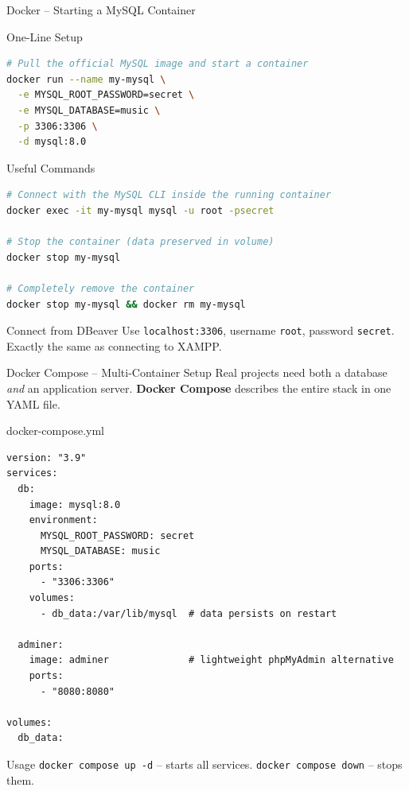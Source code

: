 \begin{frame}[fragile]{Docker -- Starting a MySQL Container}
  \begin{block}{One-Line Setup}
\begin{lstlisting}[style=sqlstyle, language=bash]
# Pull the official MySQL image and start a container
docker run --name my-mysql \
  -e MYSQL_ROOT_PASSWORD=secret \
  -e MYSQL_DATABASE=music \
  -p 3306:3306 \
  -d mysql:8.0
\end{lstlisting}
  \end{block}

  \begin{block}{Useful Commands}
\begin{lstlisting}[style=sqlstyle, language=bash]
# Connect with the MySQL CLI inside the running container
docker exec -it my-mysql mysql -u root -psecret

# Stop the container (data preserved in volume)
docker stop my-mysql

# Completely remove the container
docker stop my-mysql && docker rm my-mysql
\end{lstlisting}
  \end{block}

  \begin{examples}{Connect from DBeaver}
    Use \texttt{localhost:3306}, username \texttt{root}, password \texttt{secret}.
    Exactly the same as connecting to XAMPP.
  \end{examples}
\end{frame}

\begin{frame}[fragile]{Docker Compose -- Multi-Container Setup}
  Real projects need both a database \emph{and} an application server.
  \textbf{Docker Compose} describes the entire stack in one YAML file.

  \begin{block}{docker-compose.yml}
\begin{lstlisting}[style=sqlstyle]
version: "3.9"
services:
  db:
    image: mysql:8.0
    environment:
      MYSQL_ROOT_PASSWORD: secret
      MYSQL_DATABASE: music
    ports:
      - "3306:3306"
    volumes:
      - db_data:/var/lib/mysql  # data persists on restart

  adminer:
    image: adminer              # lightweight phpMyAdmin alternative
    ports:
      - "8080:8080"

volumes:
  db_data:
\end{lstlisting}
  \end{block}

  \begin{examples}{Usage}
    \texttt{docker compose up -d} -- starts all services.
    \texttt{docker compose down} -- stops them.
  \end{examples}
\end{frame}


